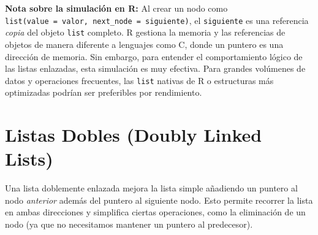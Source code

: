 \documentclass[
  spanish,
  letterpaper,
  DIV=11,
  numbers=noendperiod]{scrreprt}
\newenvironment{Shaded}{\begin{snugshade}}{\end{snugshade}}
\newcommand{\CommentTok}[1]{\textcolor[rgb]{0.37,0.37,0.37}{#1}}
\newcommand{\FunctionTok}[1]{\textcolor[rgb]{0.28,0.35,0.67}{#1}}
\newcommand{\NormalTok}[1]{\textcolor[rgb]{0.00,0.23,0.31}{#1}}
\newcommand{\SpecialCharTok}[1]{\textcolor[rgb]{0.37,0.37,0.37}{#1}}
\newcommand{\StringTok}[1]{\textcolor[rgb]{0.13,0.47,0.30}{#1}}
\begin{document}
\begin{Shaded}
\end{Shaded}

\begin{tcolorbox}[enhanced jigsaw, arc=.35mm, bottomrule=.15mm, bottomtitle=1mm, breakable, colback=white, colbacktitle=quarto-callout-note-color!10!white, colframe=quarto-callout-note-color-frame, coltitle=black, left=2mm, leftrule=.75mm, opacityback=0, opacitybacktitle=0.6, rightrule=.15mm, title=\textcolor{quarto-callout-note-color}{\faInfo}\hspace{0.5em}{Nota}, titlerule=0mm, toprule=.15mm, toptitle=1mm]

\textbf{Nota sobre la simulación en R:} Al crear un nodo como
\texttt{list(value\ =\ valor,\ next\_node\ =\ siguiente)}, el
\texttt{siguiente} es una referencia \emph{copia} del objeto
\texttt{list} completo. R gestiona la memoria y las referencias de
objetos de manera diferente a lenguajes como C, donde un puntero es una
dirección de memoria. Sin embargo, para entender el comportamiento
lógico de las listas enlazadas, esta simulación es muy efectiva. Para
grandes volúmenes de datos y operaciones frecuentes, las \texttt{list}
nativas de R o estructuras más optimizadas podrían ser preferibles por
rendimiento.

\end{tcolorbox}

\section{Listas Dobles (Doubly Linked
Lists)}\label{listas-dobles-doubly-linked-lists}

Una lista doblemente enlazada mejora la lista simple añadiendo un
puntero al nodo \emph{anterior} además del puntero al siguiente nodo.
Esto permite recorrer la lista en ambas direcciones y simplifica ciertas
operaciones, como la eliminación de un nodo (ya que no necesitamos
mantener un puntero al predecesor).
\end{document}
